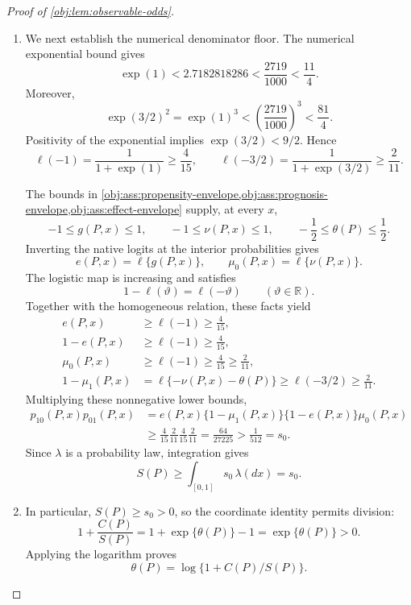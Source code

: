 \documentclass[11pt]{article}
\begin{document}
\begin{proof}[Proof of \cref{obj:lem:observable-odds}]
\begin{enumerate}
\item We next establish the numerical denominator floor. The numerical exponential bound gives
\[
\exp(1)<2.7182818286<\frac{2719}{1000}<\frac{11}{4}.
\]
Moreover,
\[
\exp(3/2)^2=\exp(1)^3
<\left(\frac{2719}{1000}\right)^3
<\frac{81}{4}.
\]
Positivity of the exponential implies \(\exp(3/2)<9/2\). Hence
\[
\ell(-1)=\frac{1}{1+\exp(1)}\ge\frac4{15},
\qquad
\ell(-3/2)=\frac{1}{1+\exp(3/2)}\ge\frac2{11}.
\]

The bounds in
\cref{obj:ass:propensity-envelope,obj:ass:prognosis-envelope,obj:ass:effect-envelope}
supply, at every \(x\),
\[
-1\le g(P,x)\le1,\qquad
-1\le\nu(P,x)\le1,\qquad
-\frac12\le\theta(P)\le\frac12.
\]
Inverting the native logits at the interior probabilities gives
\[
e(P,x)=\ell\{g(P,x)\},\qquad
\mu_0(P,x)=\ell\{\nu(P,x)\}.
\]
The logistic map is increasing and satisfies
\[
1-\ell(\vartheta)=\ell(-\vartheta)
\qquad(\vartheta\in\mathbb R).
\]
Together with the homogeneous relation, these facts yield
\[
\begin{aligned}
e(P,x)&\ge\ell(-1)\ge\frac4{15},\\
1-e(P,x)&\ge\ell(-1)\ge\frac4{15},\\
\mu_0(P,x)&\ge\ell(-1)\ge\frac4{15}\ge\frac2{11},\\
1-\mu_1(P,x)
&=\ell\{-\nu(P,x)-\theta(P)\}
 \ge\ell(-3/2)\ge\frac2{11}.
\end{aligned}
\]
Multiplying these nonnegative lower bounds,
\[
\begin{aligned}
p_{10}(P,x)p_{01}(P,x)
&=e(P,x)\{1-\mu_1(P,x)\}\{1-e(P,x)\}\mu_0(P,x)\\
&\ge\frac4{15}\frac2{11}\frac4{15}\frac2{11}
=\frac{64}{27225}
>\frac1{512}=s_0.
\end{aligned}
\]
Since \(\lambda\) is a probability law, integration gives
\[
S(P)\ge\int_{[0,1]}s_0\,\lambda(dx)=s_0.
\]

\item In particular, \(S(P)\ge s_0>0\), so the coordinate identity permits division:
\[
1+\frac{C(P)}{S(P)}
=1+\exp\{\theta(P)\}-1
=\exp\{\theta(P)\}>0.
\]
Applying the logarithm proves
\[
\theta(P)=\log\{1+C(P)/S(P)\}.
\]


\end{enumerate}
\end{proof}
\end{document}
